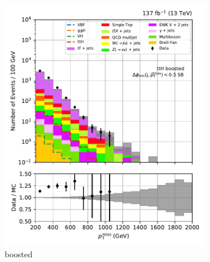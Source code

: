 \begin{figure}[htbp]
    \centering
    \begin{subfigure}[b]{0.24\textwidth}
        \includegraphics[width=\textwidth]{figures/region_plots/full_Run2/sideband_2/ttH_boosted.pdf}
        \caption{\ttH boosted}
    \end{subfigure}
    \hfill
    \begin{subfigure}[b]{0.24\textwidth}

\end{subfigure}
\end{figure}
